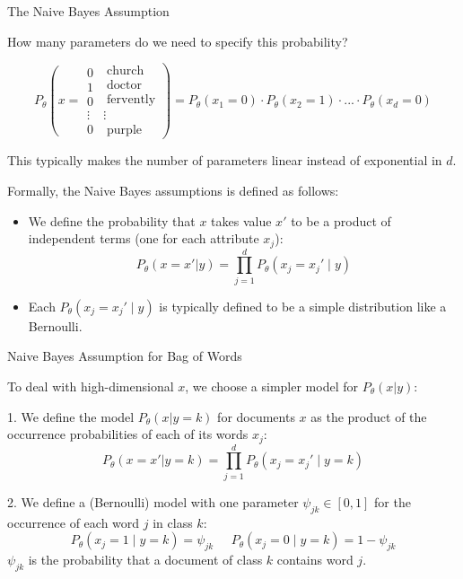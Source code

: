 \documentclass[../../generative_classifiers.tex]{subfiles}
\begin{document}
\begin{frame}[fragile]{The Naive Bayes Assumption }


How many parameters do we need to specify this probability?

$$
 P_{\theta} \left( x=
\begin{array}{c}
0 \\
1 \\
0 \\
\vdots \\
0 
\end{array}
\right.
\left.
\begin{array}{l}
\;\text{church} \\
\;\text{doctor} \\
\;\text{fervently} \\
\vdots \\
\;\text{purple}
\end{array}
\right) = P_\theta(x_1=0) \cdot P_\theta(x_2=1) \cdot ... \cdot P_\theta(x_d=0)
$$

This typically makes the number of parameters linear instead of exponential in $d$.

\vspace{0.2cm}

Formally, the Naive Bayes assumptions is defined as follows:

 \begin{itemize}
     \item We define the probability that $x$ takes value $x'$ to be a product of independent terms (one for each attribute $x_j$): $$ P_\theta(x=x'|y) = \prod_{j=1}^d P_\theta(x_j = x_j' \mid y) $$
     \item Each $P_\theta(x_j = x_j' \mid y)$ is typically defined to be a simple distribution like a Bernoulli.
 \end{itemize}


\end{frame}

\begin{frame}[fragile]{Naive Bayes Assumption for Bag of Words}

To deal with high-dimensional $x$, we choose a simpler model for $P_\theta(x|y)$:
\vspace{0.2cm}

1. We define the model $P_\theta(x|y=k)$ for documents $x$ as the product of the occurrence probabilities of each of its words $x_j$:
    $$ P_\theta(x = x'|y=k) = \prod_{j=1}^d P_\theta(x_j = x_j' \mid y=k) $$

2. We define a (Bernoulli) model with one parameter $\psi_{jk} \in [0,1]$ for the occurrence of each word $j$ in class $k$:
    $$P_\theta(x_j = 1 \mid y=k) = \psi_{jk} \;\;\;\;\; P_\theta(x_j = 0 \mid y=k) = 1-\psi_{jk}$$
    $\psi_{jk}$ is the probability that a document of class $k$ contains word $j$.



\end{frame}
\end{document}

